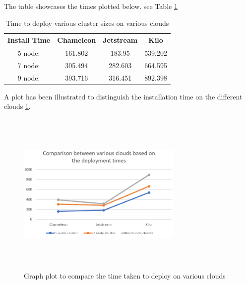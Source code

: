 \documentclass[9pt,twocolumn,twoside]{../../styles/osajnl}
\begin{document}
The table showcases the times plotted below. see Table \ref{T:gvc}
\begin{table}[h]
\begin{center}
  \centering
  \caption{ Time to deploy various cluster sizes on various clouds}
  \label{T:gvc}
 \begin{tabular}{|c|| c c c|} 
 \hline
 Install Time & Chameleon  & Jetstream & Kilo \\ [0.5ex]
 \hline\hline
 5 node: & 161.802 & 183.95 & 539.202\\
 \hline
 7 node: & 305.494 & 282.603 & 664.595 \\
 \hline
 9 node: & 393.716 & 316.451 & 892.398 \\
 \hline
\end{tabular}
\end{center}
\end{table}

A plot has been illustrated to distinguish the installation time on the different 
clouds \ref{gvc}.
\begin{figure}[!htb]
  \includegraphics[width=8cm,height=8cm,keepaspectratio,width=\linewidth]{images/bar-4.png}
  \caption{Graph plot to compare the time taken to deploy on various clouds}
  \label{gvc}
\end{figure}
\end{document}
